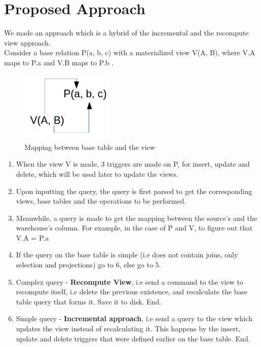 \documentclass[12pt]{report}
\begin{document}
\section{Proposed Approach}
We made an approach which is a hybrid of the incremental and the recompute view approach. \\Consider a base relation P(a, b, c) with a materialized view V(A, B), where V.A maps to P.a and V.B maps to P.b .
\begin{figure}[H]
\centering \includegraphics[width=0.4\textwidth]{images/mapping.png}
\caption{Mapping between base table and the view}
\end{figure}
\begin{enumerate}
  \item When the view V is made, 3 triggers are made on P, for insert, update and delete, which will be used later to update the views.
  \item Upon inputting the query, the query is first parsed to get the corresponding views, base tables and the operations to be performed.
  \item Meanwhile, a query is made to get the mapping between the source's and the warehouse's column. For example, in the case of P and V, to figure out that V.A = P.a
  \item If the query on the base table is simple (i.e does not contain joins, only selection and projections) go to 6, else go to 5.
  \item Complex query - \textbf{Recompute View}, i.e send a command to the view to recompute itself, i.e delete the previous existence, and recalculate the base table query that forms it. Save it to disk. End.
  \item Simple query - \textbf{Incremental approach}, i.e send a query to the view which updates the view instead of recalculating it. This happens by the insert, update and delete triggers that were defined earlier on the base table. End.\\
\end{enumerate}
\end{document}
